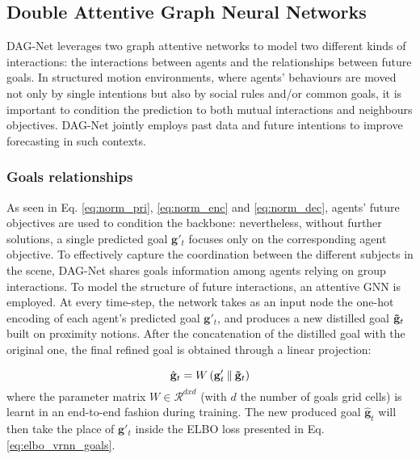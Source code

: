 \documentclass[10pt,a4paper,conference]{IEEEtran}
\begin{document}
\subsection{Double Attentive Graph Neural Networks}
DAG-Net leverages two graph attentive networks to model two different kinds of interactions: the interactions between agents and the relationships between future goals. In structured motion environments, where agents' behaviours are moved not only by single intentions but also by social rules and/or common goals, it is important to condition the prediction to both mutual interactions and neighbours objectives. DAG-Net jointly employs past data and future intentions to improve forecasting in such contexts.


\subsubsection{Goals relationships}
As seen in Eq. \eqref{eq:norm_pri}, \eqref{eq:norm_enc} and \eqref{eq:norm_dec}, agents' future objectives are used to condition the backbone: nevertheless, without further solutions, a single predicted goal $\mathbf{g}'_{t}$ focuses only on the corresponding agent objective. To effectively capture the coordination between the different subjects in the scene, DAG-Net shares goals information among agents relying on group interactions. To model the structure of future interactions, an attentive GNN \cite{gat} is employed. At every time-step, the network takes as an input node the one-hot encoding of each agent's predicted goal $\mathbf{g}'_{t}$, and produces a new distilled goal $\mathbf{\Tilde{g}}_t$ built on proximity notions. After the concatenation of the distilled goal with the original one, the final refined goal is obtained through a linear projection:

\begin{equation}
    \label{eq:gg}
    \hat{\mathbf{g}}_{t} = W \left(\mathbf{g}'_{t} \mathbin\Vert \mathbf{\Tilde{g}}_{t}\right)
\end{equation}
where the parameter matrix $W \in \mathcal{R}^{dxd} $ (with $d$ the number of goals grid cells) is learnt in an end-to-end fashion during training. The new produced goal $\hat{\mathbf{g}}_{t}$ will then take the place of $\mathbf{g}'_{t}$ inside the ELBO loss presented in Eq. \eqref{eq:elbo_vrnn_goals}.
\end{document}
